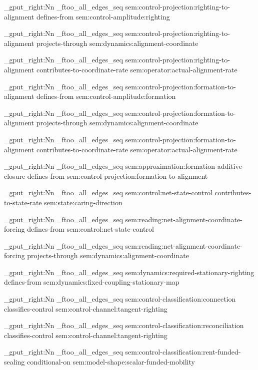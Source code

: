 \seq_gput_right:Nn \g_ftoo_all_edges_seq { { sem:control-projection:righting-to-alignment } { defines-from } { sem:control-amplitude:righting } }

\seq_gput_right:Nn \g_ftoo_all_edges_seq { { sem:control-projection:righting-to-alignment } { projects-through } { sem:dynamics:alignment-coordinate } }

\seq_gput_right:Nn \g_ftoo_all_edges_seq { { sem:control-projection:righting-to-alignment } { contributes-to-coordinate-rate } { sem:operator:actual-alignment-rate } }

\seq_gput_right:Nn \g_ftoo_all_edges_seq { { sem:control-projection:formation-to-alignment } { defines-from } { sem:control-amplitude:formation } }

\seq_gput_right:Nn \g_ftoo_all_edges_seq { { sem:control-projection:formation-to-alignment } { projects-through } { sem:dynamics:alignment-coordinate } }

\seq_gput_right:Nn \g_ftoo_all_edges_seq { { sem:control-projection:formation-to-alignment } { contributes-to-coordinate-rate } { sem:operator:actual-alignment-rate } }

\seq_gput_right:Nn \g_ftoo_all_edges_seq { { sem:approximation:formation-additive-closure } { defines-from } { sem:control-projection:formation-to-alignment } }

\seq_gput_right:Nn \g_ftoo_all_edges_seq { { sem:control:net-state-control } { contributes-to-state-rate } { sem:state:caring-direction } }

\seq_gput_right:Nn \g_ftoo_all_edges_seq { { sem:reading:net-alignment-coordinate-forcing } { defines-from } { sem:control:net-state-control } }

\seq_gput_right:Nn \g_ftoo_all_edges_seq { { sem:reading:net-alignment-coordinate-forcing } { projects-through } { sem:dynamics:alignment-coordinate } }

\seq_gput_right:Nn \g_ftoo_all_edges_seq { { sem:dynamics:required-stationary-righting } { defines-from } { sem:dynamics:fixed-coupling-stationary-map } }

\seq_gput_right:Nn \g_ftoo_all_edges_seq { { sem:control-classification:connection } { classifies-control } { sem:control-channel:tangent-righting } }

\seq_gput_right:Nn \g_ftoo_all_edges_seq { { sem:control-classification:reconciliation } { classifies-control } { sem:control-channel:tangent-righting } }

\seq_gput_right:Nn \g_ftoo_all_edges_seq { { sem:control-classification:rent-funded-sealing } { conditional-on } { sem:model-shape:scalar-funded-mobility } }

